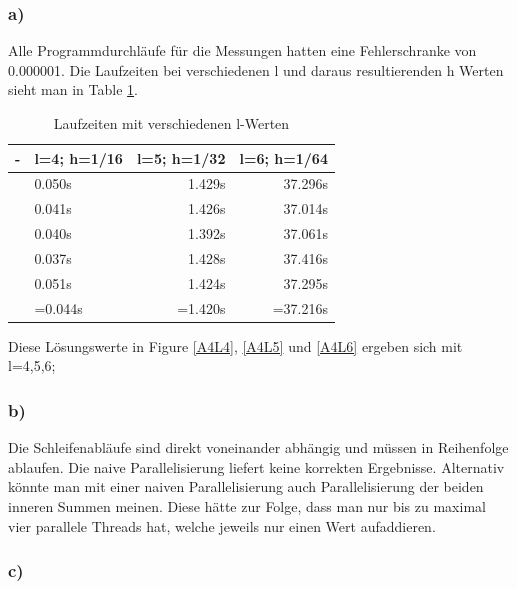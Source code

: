 \documentclass{report}
\begin{document}
	\subsubsection{a)}
Alle Programmdurchläufe für die Messungen hatten eine Fehlerschranke von 0.000001. Die Laufzeiten bei verschiedenen l und daraus resultierenden h Werten sieht man in Table \ref{Table:4a}.
\begin{table}
	\centering
\begin{tabular}{|l|l|r|r|}
		\hline
		- & l=4; h=1/16 & l=5; h=1/32 & l=6; h=1/64\\
		\hline
		& 0.050s & 1.429s & 37.296s \\
		& 0.041s & 1.426s & 37.014s  \\
		& 0.040s & 1.392s & 37.061s \\
		& 0.037s & 1.428s & 37.416s  \\
		& 0.051s & 1.424s & 37.295s  \\
		& =0.044s & =1.420s & =37.216s  \\
		\hline

	\end{tabular}
	\caption{Laufzeiten mit verschiedenen l-Werten}
	\label{Table:4a}
\end{table}
	\newline Diese Lösungswerte in Figure \ref{A4L4}, \ref{A4L5} und \ref{A4L6} ergeben sich mit l=4,5,6;  \newline
	
	\subsubsection{b)}
	Die Schleifenabläufe sind direkt voneinander abhängig und müssen in Reihenfolge ablaufen. Die naive Parallelisierung liefert keine korrekten Ergebnisse. Alternativ könnte man mit einer naiven Parallelisierung auch Parallelisierung der beiden inneren Summen meinen. Diese hätte zur Folge, dass man nur bis zu maximal vier parallele Threads hat, welche jeweils nur einen Wert aufaddieren.
	\subsubsection{c)}
\end{document}
